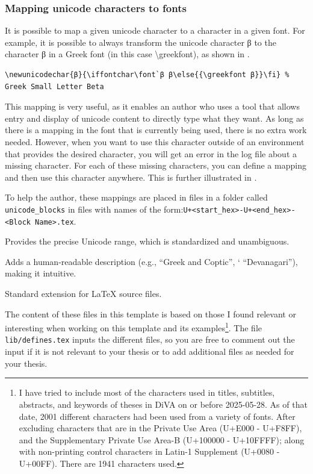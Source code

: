 \documentclass[12pt, twoside]{article}
\begin{document}
\subsubsection{Mapping unicode characters to fonts}

It is possible to map a given unicode character to a character in a given font. For example, it is possible to always transform the unicode character β to the character β in a Greek font (in this case \textbackslash greekfont), as shown in .
\begin{lstlisting}[style=latexExampleForAuthors, caption={Mapping the unicode β character to a particular character in the greekfont}, label=lst:MappingbetaToGreekfont]
\newunicodechar{β}{\iffontchar\font`β β\else{{\greekfont β}}\fi} % Greek Small Letter Beta
\end{lstlisting}

This mapping is very useful, as it enables an author who uses a tool that allows entry and display of unicode content to directly type what they want. As long as there is a mapping in the font that is currently being used, there is no extra work needed. However, when you want to use this character outside of an environment that provides the desired character, you will get an error in the log file about a missing character. For each of these missing characters, you can define a mapping and then use this character anywhere. This is further illustrated in .

To help the author, these mappings are placed in files in a folder called \texttt{unicode\_blocks} in files with names of the form:\linebreak[4]
\texttt{U+<start\_hex>-U+<end\_hex>-<Block Name>.tex}.
\begin{description}[labelwidth =\widthof{\textbf{U+<start\_hex>-U+<end\_hex>}}, leftmargin = !]
    \item[U+<start\_hex>-U+<end\_hex>] Provides the precise Unicode range, which is standardized and unambiguous.
\item[<Block Name>] Adds a human-readable description (e.g., ``Greek and Coptic'', ` ``Devanagari''), making it intuitive.
\item[.tex] Standard extension for LaTeX source files.
\end{description}

The content of these files in this template is based on those I found relevant or interesting when working on this template and its examples\footnote{I have tried to include most of the characters used in titles, subtitles, abstracts, and keywords of theses in DiVA on or before 2025-05-28. As of that date, 2001 different characters had been used from a variety of fonts. After excluding characters that are in the Private Use Area (U+E000 - U+F8FF), and the Supplementary Private Use Area-B (U+100000 - U+10FFFF); along with non-printing control characters in Latin-1 Supplement (U+0080 - U+00FF). There are 1941 characters used.}. The file \texttt{lib/defines.tex} inputs the different files, so you are free to comment out the input if it is not relevant to your thesis or to add additional files as needed for your thesis.
\end{document}
